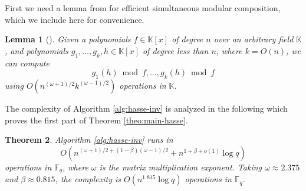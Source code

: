 \documentclass[12pt]{article}
\theoremstyle{plain}
\newtheorem{theorem}{Theorem}
\newtheorem{lemma}[theorem]{Lemma}
\theoremstyle{definition}
\def\F{\ensuremath{\mathbb{F}}}
\def\K{\ensuremath{\mathbb{K}}}
\begin{document}
First we need a lemma from \cite{ks} for efficient simultaneous modular composition, which we 
include here for convenience.
\begin{lemma}[\cite{ks}]
	\label{lemma:ks}
	Given a polynomials $f \in \K[x]$ of degree $n$ over an arbitrary field $\K$, and polynomials 
	$g_1, \dots, g_k, h \in \K[x]$ of degree less than $n$, where $k = O(n)$, we can compute 
	\[ g_1(h) \bmod f, \dots, g_k(h) \bmod f \]
	using $O(n^{(\omega + 1) / 2} k^{(\omega - 1) / 2})$ operations in $\K$.
\end{lemma}
The complexity of Algorithm \ref{alg:hasse-inv} is analyzed in the following which proves the first 
part of Theorem \ref{theo:main-hasse}.
\begin{theorem}
	\label{theo:hasse-inv}
	Algorithm \ref{alg:hasse-inv} runs in
	\[O(n^{(\omega + 1) / 2 + (1 - \beta)(\omega - 1) / 2} + n^{1 + \beta + o(1)}\log q)\] 
	operations in $\F_q$, where $\omega$ is the matrix multiplication exponent. Taking $\omega 
	\approx	2.375$ and $\beta \approx 0.815$, the complexity is $O(n^{1.815}\log q)$ operations in 
	$\F_q$.
\end{theorem}
\end{document}
